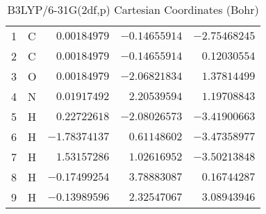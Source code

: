 \documentclass[10pt,oneside]{article}
\begin{document}
\begin{table}[h!]
\centering
\caption{B3LYP/6-31G(2df,p) Cartesian Coordinates (Bohr)}
\begin{tabular}{llrrr}
1  & C  & $ 0.00184979$ & $-0.14655914$ & $-2.75468245$ \\
2  & C  & $ 0.00184979$ & $-0.14655914$ & $ 0.12030554$ \\
3  & O  & $ 0.00184979$ & $-2.06821834$ & $ 1.37814499$ \\
4  & N  & $ 0.01917492$ & $ 2.20539594$ & $ 1.19708843$ \\
5  & H  & $ 0.22722618$ & $-2.08026573$ & $-3.41900663$ \\
6  & H  & $-1.78374137$ & $ 0.61148602$ & $-3.47358977$ \\
7  & H  & $ 1.53157286$ & $ 1.02616952$ & $-3.50213848$ \\
8  & H  & $-0.17499254$ & $ 3.78883087$ & $ 0.16744287$ \\
9  & H  & $-0.13989596$ & $ 2.32547067$ & $ 3.08943946$ \\
\end{tabular}
\end{table}

\clearpage
\end{document}
